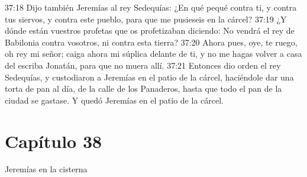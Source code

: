 37:18 Dijo también Jeremías al rey Sedequías: ¿En qué pequé contra ti, y contra tus siervos, y contra este pueblo, para que me pusieseis en la cárcel? 
37:19 ¿Y dónde están vuestros profetas que os profetizaban diciendo: No vendrá el rey de Babilonia contra vosotros, ni contra esta tierra? 
37:20 Ahora pues, oye, te ruego, oh rey mi señor; caiga ahora mi súplica delante de ti, y no me hagas volver a casa del escriba Jonatán, para que no muera allí. 
37:21 Entonces dio orden el rey Sedequías, y custodiaron a Jeremías en el patio de la cárcel, haciéndole dar una torta de pan al día, de la calle de los Panaderos, hasta que todo el pan de la ciudad se gastase. Y quedó Jeremías en el patio de la cárcel. 
\section*{Capítulo 38} 
Jeremías en la cisterna 
 
